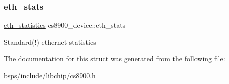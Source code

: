 \subsubsection{\texorpdfstring{eth\_stats}{eth\_stats}}
{\footnotesize\ttfamily \mbox{\hyperlink{structeth__statistics}{eth\+\_\+statistics}} cs8900\+\_\+device\+::eth\+\_\+stats}

Standard(!) ethernet statistics 

The documentation for this struct was generated from the following file\+:\begin{DoxyCompactItemize}
\item 
bsps/include/libchip/cs8900.\+h\end{DoxyCompactItemize}
